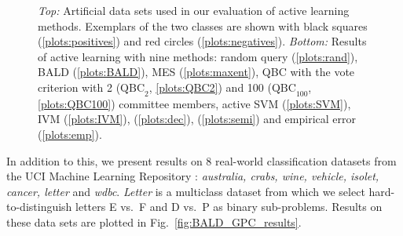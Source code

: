 \begin{figure}
	\begin{center}
	\begin{tabular}{ccc}
	\end{tabular}
	\end{center}
	\caption[Evaluation of Bayesian active learning on artificial data sets]{\emph{Top:} Artificial data sets used in our evaluation of active learning methods. Exemplars of the two classes are shown with black squares (\ref{plots:positives}) and red circles (\ref{plots:negatives}). \emph{Bottom:} Results of active learning with nine methods: random query (\ref{plots:rand}), BALD (\ref{plots:BALD}),  MES (\ref{plots:maxent}), QBC with the vote criterion with 2 ($\mbox{QBC}_2$, \ref{plots:QBC2}) and 100 ($\mbox{QBC}_{100}$, \ref{plots:QBC100}) committee members, active SVM (\ref{plots:SVM}), IVM (\ref{plots:IVM}), \citet{Kapoor2007} (\ref{plots:dec}), \citet{Zhu2003} (\ref{plots:semi}) and empirical error (\ref{plots:emp}).}
	\label{fig:artificial}
\end{figure}

In addition to this, we present results on 8 real-world classification datasets from the UCI Machine Learning Repository \citep{UCIRepository}: \emph{australia, crabs, wine, vehicle, isolet, cancer, letter} and \emph{wdbc}. \emph{Letter} is a multiclass dataset from which we select hard-to-distinguish letters E vs.\ F and D vs.\ P as binary sub-problems. Results on these data sets are plotted in Fig.\ \ref{fig:BALD_GPC_results}.

